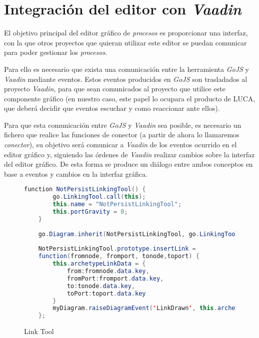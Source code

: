\section{Integración del editor con \emph{Vaadin}}

El objetivo principal del editor gráfico de \emph{procesos} es proporcionar una interfaz, con la que otros proyectos que quieran utilizar este editor se puedan comunicar para poder gestionar los \emph{procesos}.

Para ello es necesario que exista una comunicación entre la herramienta \emph{GoJS} y \emph{Vaadin} mediante eventos. Estos eventos producidos en \emph{GoJS} son trasladados al proyecto \emph{Vaadin}, para que sean comunicados al proyecto que utilice este componente gráfico (en nuestro caso, este papel lo ocupara el producto de LUCA, que deberá decidir que eventos escuchar y como reaccionar ante ellos).

Para que esta comunicación entre \emph{GoJS} y \emph{Vaadin} sea posible, es necesario un fichero que realice las funciones de conector (a partir de ahora lo llamaremos \emph{conector}), su objetivo será comunicar a \emph{Vaadin} de los eventos ocurrido en el editor gráfico y, siguiendo las órdenes de \emph{Vaadin} realizar cambios sobre la interfaz del editor gráfico. De esta forma se produce un diálogo entre ambos conceptos en base a eventos y cambios en la interfaz gráfica.



\begin{figure}[!tb]
	\centering
	\begin{lstlisting}[language=Java]
	function NotPersistLinkingTool() {
		go.LinkingTool.call(this);
		this.name = "NotPersistLinkingTool";
		this.portGravity = 0; 
	}
	
	go.Diagram.inherit(NotPersistLinkingTool, go.LinkingTool);
	
	NotPersistLinkingTool.prototype.insertLink = 
	function(fromnode, fromport, tonode,toport) {
		this.archetypeLinkData = {
			from:fromnode.data.key,
			fromPort:fromport.data.key,
			to:tonode.data.key,
			toPort:toport.data.key
		}
		myDiagram.raiseDiagramEvent('LinkDrawn', this.archetypeLinkData);
	};\end{lstlisting}
	\caption{Link Tool}
	\label{fig:linkTool}
\end{figure}

